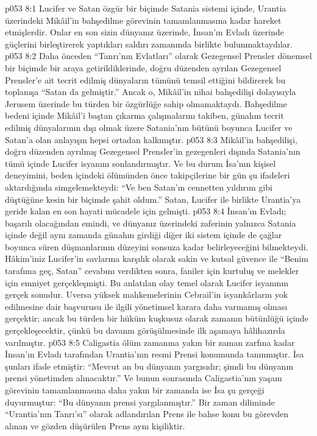 \vs p053 8:1 Lucifer ve Satan özgür bir biçimde Satania sistemi içinde, Urantia üzerindeki Mikâil’in bahşedilme görevinin tamamlanmasına kadar hareket etmişlerdir. Onlar en son sizin dünyanız üzerinde, İnsan’ın Evladı üzerinde güçlerini birleştirerek yaptıkları saldırı zamanında birlikte bulunmaktaydılar.
\vs p053 8:2 Daha önceden “Tanrı’nın Evlatları” olarak Gezegensel Prensler dönemsel bir biçimde bir araya getirildiklerinde, doğru düzenden ayrılan Gezegensel Prensler’e ait tecrit edilmiş dünyaların tümünü temsil ettiğini bildirerek bu toplanışa “Satan da gelmiştir.” Ancak o, Mikâil’in nihai bahşedilişi dolayısıyla Jerusem üzerinde bu türden bir özgürlüğe sahip olmamaktaydı. Bahşedilme bedeni içinde Mikâil’i baştan çıkarma çalışmalarını takiben, günahın tecrit edilmiş dünyalarının dışı olmak üzere Satania’nın bütünü boyunca Lucifer ve Satan’a olan anlayışın hepsi ortadan kalkmıştır.
\vs p053 8:3 Mikâil’in bahşedilişi, doğru düzenden ayrılmış Gezegensel Prensler’in gezegenleri dışında Satania’nın tümü içinde Lucifer isyanını sonlandırmıştır. Ve bu durum İsa’nın kişisel deneyimini, beden içindeki ölümünden önce takipçilerine bir gün şu ifadeleri aktardığında simgelemekteydi: “Ve ben Satan’ın cennetten yıldırım gibi düştüğüne kesin bir biçimde şahit oldum.” Satan, Lucifer ile birlikte Urantia’ya geride kalan en son hayati mücadele için gelmişti.
\vs p053 8:4 İnsan’ın Evladı; başarılı olacağından emindi, ve dünyanız üzerindeki zaferinin yalnızca Satania içinde değil aynı zamanda günahın girdiği diğer iki sistem içinde de çağlar boyunca süren düşmanlarının düzeyini sonsuza kadar belirleyeceğini bilmekteydi. Hâkim’iniz Lucifer’in savlarına karşılık olarak sakin ve kutsal güvence ile “Benim tarafıma geç, Satan” cevabını verdikten sonra, faniler için kurtuluş ve melekler için emniyet gerçekleşmişti. Bu anlatılan olay temel olarak Lucifer isyanının gerçek sonudur. Uversa yüksek mahkemelerinin Cebrail’in isyankârların yok edilmesine dair başvurusu ile ilgili yönetimsel karara daha varmamış olması gerçektir; ancak bu türden bir hüküm kuşkusuz olarak zamanın bütünlüğü içinde gerçekleşecektir, çünkü bu davanın görüşülmesinde ilk aşamaya hâlihazırda varılmıştır.
\vs p053 8:5 Caligastia ölüm zamanına yakın bir zaman zarfına kadar İnsan’ın Evladı tarafından Urantia’nın resmi Prensi konumunda tanınmıştır. İsa şunları ifade etmiştir: “Mevcut an bu dünyanın yargısıdır; şimdi bu dünyanın prensi yönetimden alınacaktır.” Ve bunun sonrasında Caligastia’nın yaşam görevinin tamamlanmasına daha yakın bir zamanda ise İsa şu gerçeği duyurmuştur: “Bu dünyanın prensi yargılanmıştır.” Bir zaman diliminde “Urantia’nın Tanrı’sı” olarak adlandırılan Prens ile bahse konu bu görevden alınan ve gözden düşürülen Prens aynı kişiliktir.
